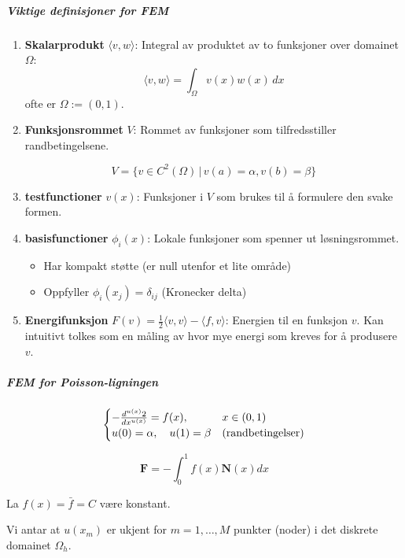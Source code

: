 \subparagraph{Viktige definisjoner for FEM}
\begin{enumerate}
  \item \textbf{Skalarprodukt} \(\langle v, w \rangle\): Integral av produktet av to funksjoner over \gls{domain}et \(\Omega\):
        \[ \langle v, w \rangle = \int_\Omega v(x)w(x) \, dx \]
        ofte er \(\Omega := (0,1)\).
  \item \textbf{Funksjonsrommet} \(V\): Rommet av funksjoner som tilfredsstiller randbetingelsene.

        \[ V = \{ v \in C^2(\Omega) \, | \, v(a) = \alpha, v(b) = \beta \} \]

  \item \textbf{\gls{testfunction}er} \(v(x)\): Funksjoner i \(V\) som brukes til å formulere den svake formen.
  \item \textbf{\gls{basisfunction}er} \(\phi_i(x)\): Lokale funksjoner som spenner ut løsningsrommet.
        \begin{itemize}
          \item Har kompakt støtte (er null utenfor et lite område)
          \item Oppfyller \(\phi_i(x_j) = \delta_{ij}\) (Kronecker delta)
        \end{itemize}
  \item \textbf{Energifunksjon} \(F(v) = \frac{1}{2} \langle v, v \rangle - \langle f, v \rangle\): Energien til en funksjon \(v\). Kan intuitivt tolkes som en måling av hvor mye energi som kreves for å produsere \(v\).
\end{enumerate}

\subparagraph{FEM for Poisson-ligningen}
\begin{equation}
  \begin{cases}
    -\ddn[2]{u(x)}{x} = f(x),         & x \in (0,1)              \\
    u(0) = \alpha, \quad u(1) = \beta & \text{(randbetingelser)}
  \end{cases}
  \label{eq:pde_poisson}
\end{equation}

\begin{equation}
  \mathbf{F} = - \int_0^1 f(x) \mathbf{N}(x) dx
\end{equation}

La \(f(x) = \bar{f} = C\) være konstant.

Vi antar at \(u(x_m)\) er ukjent for \(m = 1, \ldots, M\) punkter (noder) i det diskrete \gls{domain}et \(\Omega_h\).

